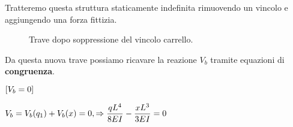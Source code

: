 \documentclass[a4paper,12pt, oneside]{book}
\begin{document}
	\phantom{.}
	
	Tratteremo questa struttura staticamente indefinita rimuovendo un vincolo e aggiungendo una forza fittizia.
	
	\begin{figure}[H]
		\centering
		\hspace*{-1cm}
		\caption{Trave dopo soppressione del vincolo carrello.}
		\label{fig:sbalzounoforzafitt}
	\end{figure}
	
	Da questa nuova trave possiamo ricavare la reazione $V_b$ tramite equazioni di \textbf{congruenza}.
	
	\phantom{.}
	
	$[V_b=0]\hfill$
	
	$V_b = V_b(q_1)+V_b(x)=0, \Rightarrow \dfrac{qL^{4}}{8EI} - \dfrac{xL^{3}}{3EI} = 0\hfill$
	
\end{document}
